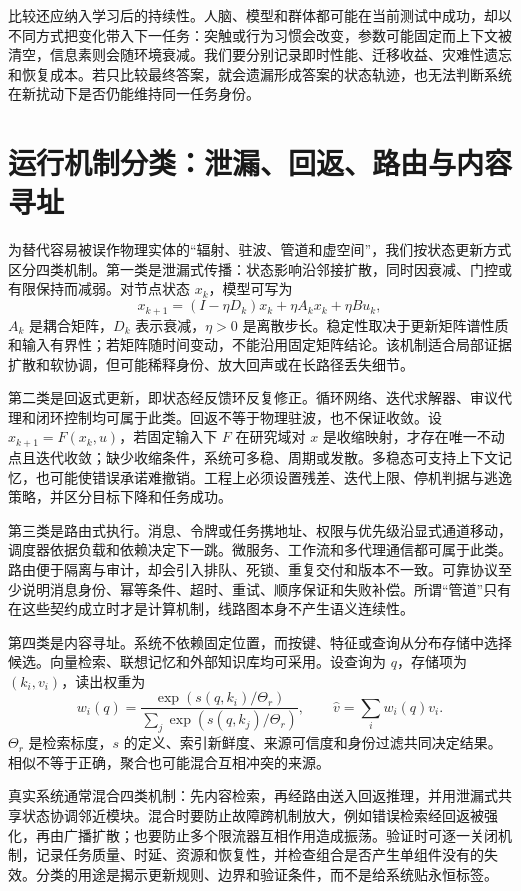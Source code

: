 比较还应纳入学习后的持续性。人脑、模型和群体都可能在当前测试中成功，却以不同方式把变化带入下一任务：突触或行为习惯会改变，参数可能固定而上下文被清空，信息素则会随环境衰减。我们要分别记录即时性能、迁移收益、灾难性遗忘和恢复成本。若只比较最终答案，就会遗漏形成答案的状态轨迹，也无法判断系统在新扰动下是否仍能维持同一任务身份。

\section{运行机制分类：泄漏、回返、路由与内容寻址}
\label{sec:section_3702}

为替代容易被误作物理实体的“辐射、驻波、管道和虚空间”，我们按状态更新方式区分四类机制。第一类是泄漏式传播：状态影响沿邻接扩散，同时因衰减、门控或有限保持而减弱。对节点状态 $x_k$，模型可写为
\[
x_{k+1}=(I-\eta D_k)x_k+\eta A_kx_k+\eta Bu_k,
\]
$A_k$ 是耦合矩阵，$D_k$ 表示衰减，$\eta>0$ 是离散步长。稳定性取决于更新矩阵谱性质和输入有界性；若矩阵随时间变动，不能沿用固定矩阵结论。该机制适合局部证据扩散和软协调，但可能稀释身份、放大回声或在长路径丢失细节。

第二类是回返式更新，即状态经反馈环反复修正。循环网络、迭代求解器、审议代理和闭环控制均可属于此类。回返不等于物理驻波，也不保证收敛。设 $x_{k+1}=F(x_k,u)$，若固定输入下 $F$ 在研究域对 $x$ 是收缩映射，才存在唯一不动点且迭代收敛；缺少收缩条件，系统可多稳、周期或发散。多稳态可支持上下文记忆，也可能使错误承诺难撤销。工程上必须设置残差、迭代上限、停机判据与逃逸策略，并区分目标下降和任务成功。

第三类是路由式执行。消息、令牌或任务携地址、权限与优先级沿显式通道移动，调度器依据负载和依赖决定下一跳。微服务、工作流和多代理通信都可属于此类。路由便于隔离与审计，却会引入排队、死锁、重复交付和版本不一致。可靠协议至少说明消息身份、幂等条件、超时、重试、顺序保证和失败补偿。所谓“管道”只有在这些契约成立时才是计算机制，线路图本身不产生语义连续性。

第四类是内容寻址。系统不依赖固定位置，而按键、特征或查询从分布存储中选择候选。向量检索、联想记忆和外部知识库均可采用。设查询为 $q$，存储项为 $(k_i,v_i)$，读出权重为
\[
w_i(q)=\frac{\exp(s(q,k_i)/\Theta_r)}{\sum_j\exp(s(q,k_j)/\Theta_r)},\qquad \hat v=\sum_iw_i(q)v_i.
\]
$\Theta_r$ 是检索标度，$s$ 的定义、索引新鲜度、来源可信度和身份过滤共同决定结果。相似不等于正确，聚合也可能混合互相冲突的来源。

真实系统通常混合四类机制：先内容检索，再经路由送入回返推理，并用泄漏式共享状态协调邻近模块。混合时要防止故障跨机制放大，例如错误检索经回返被强化，再由广播扩散；也要防止多个限流器互相作用造成振荡。验证时可逐一关闭机制，记录任务质量、时延、资源和恢复性，并检查组合是否产生单组件没有的失效。分类的用途是揭示更新规则、边界和验证条件，而不是给系统贴永恒标签。

